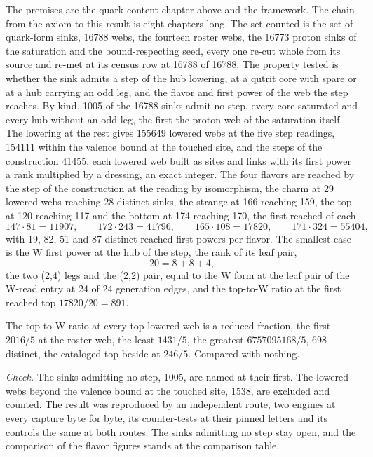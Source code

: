 \begin{chproof}[census]
The premises are the quark content chapter above and the framework. The chain from the axiom to this result is eight chapters long. The set counted is the set of quark-form sinks, 16788 webs, the fourteen roster webs, the 16773 proton sinks of the saturation and the bound-respecting seed, every one re-cut whole from its source and re-met at its census row at 16788 of 16788. The property tested is whether the sink admits a step of the hub lowering, at a qutrit core with spare or at a hub carrying an odd leg, and the flavor and first power of the web the step reaches. By kind. 1005 of the 16788 sinks admit no step, every core saturated and every hub without an odd leg, the first the proton web of the saturation itself. The lowering at the rest gives 155649 lowered webs at the five step readings, 154111 within the valence bound at the touched site, and the steps of the construction 41455, each lowered web built as sites and links with its first power a rank multiplied by a dressing, an exact integer. The four flavors are reached by the step of the construction at the reading by isomorphism, the charm at 29 lowered webs reaching 28 distinct sinks, the strange at 166 reaching 159, the top at 120 reaching 117 and the bottom at 174 reaching 170, the first reached of each
\begin{equation}
147 \cdot 81 = 11907, \qquad 172 \cdot 243 = 41796, \qquad 165 \cdot 108 = 17820, \qquad 171 \cdot 324 = 55404 ,
\end{equation}
with 19, 82, 51 and 87 distinct reached first powers per flavor. The smallest case is the W first power at the hub of the step, the rank of its leaf pair,
\begin{equation}
20 = 8 + 8 + 4 ,
\end{equation}
the two (2,4) legs and the (2,2) pair, equal to the W form at the leaf pair of the W-read entry at 24 of 24 generation edges, and the top-to-W ratio at the first reached top $17820/20 = 891$.

The top-to-W ratio at every top lowered web is a reduced fraction, the first $2016/5$ at the roster web, the least $1431/5$, the greatest $6757095168/5$, 698 distinct, the cataloged top beside at $246/5$. Compared with nothing.

\emph{Check.} The sinks admitting no step, 1005, are named at their first. The lowered webs beyond the valence bound at the touched site, 1538, are excluded and counted. The result was reproduced by an independent route, two engines at every capture byte for byte, its counter-tests at their pinned letters and its controls the same at both routes.
The sinks admitting no step stay open, and the comparison of the flavor figures stands at the comparison table.
\end{chproof}
\label{chend:VII-7-D536267-qlsk-t1}
